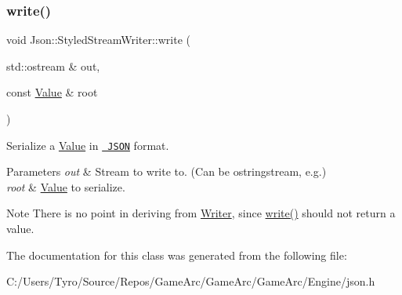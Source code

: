 \subsubsection{\texorpdfstring{write()}{write()}}
{\footnotesize\ttfamily void Json\+::\+Styled\+Stream\+Writer\+::write (\begin{DoxyParamCaption}\item[{std\+::ostream \&}]{out,  }\item[{const \mbox{\hyperlink{class_json_1_1_value}{Value}} \&}]{root }\end{DoxyParamCaption})}



Serialize a \mbox{\hyperlink{class_json_1_1_value}{Value}} in \href{http://www.json.org}{\texttt{ J\+S\+ON}} format. 


\begin{DoxyParams}{Parameters}
{\em out} & Stream to write to. (Can be ostringstream, e.\+g.) \\
\hline
{\em root} & \mbox{\hyperlink{class_json_1_1_value}{Value}} to serialize. \\
\hline
\end{DoxyParams}
\begin{DoxyNote}{Note}
There is no point in deriving from \mbox{\hyperlink{class_json_1_1_writer}{Writer}}, since \mbox{\hyperlink{class_json_1_1_styled_stream_writer_a07807741c6c43ecd35885a87234d0805}{write()}} should not return a value. 
\end{DoxyNote}


The documentation for this class was generated from the following file\+:\begin{DoxyCompactItemize}
\item 
C\+:/\+Users/\+Tyro/\+Source/\+Repos/\+Game\+Arc/\+Game\+Arc/\+Game\+Arc/\+Engine/json.\+h\end{DoxyCompactItemize}
